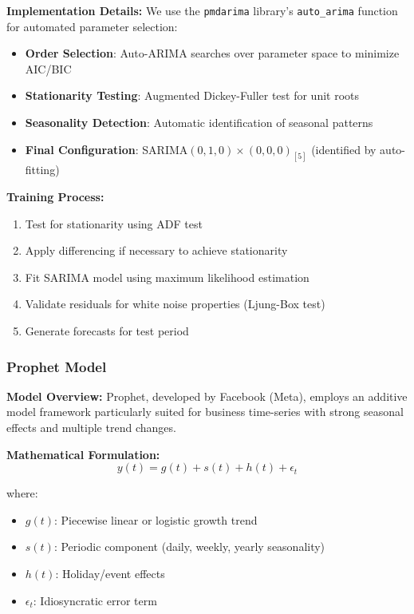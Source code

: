 \textbf{Implementation Details:}
We use the \texttt{pmdarima} library's \texttt{auto\_arima} function for automated parameter selection:

\begin{itemize}
    \item \textbf{Order Selection}: Auto-ARIMA searches over parameter space to minimize AIC/BIC
    \item \textbf{Stationarity Testing}: Augmented Dickey-Fuller test for unit roots
    \item \textbf{Seasonality Detection}: Automatic identification of seasonal patterns
    \item \textbf{Final Configuration}: SARIMA$(0,1,0) \times (0,0,0)_{[5]}$ (identified by auto-fitting)
\end{itemize}

\textbf{Training Process:}
\begin{enumerate}
    \item Test for stationarity using ADF test
    \item Apply differencing if necessary to achieve stationarity
    \item Fit SARIMA model using maximum likelihood estimation
    \item Validate residuals for white noise properties (Ljung-Box test)
    \item Generate forecasts for test period
\end{enumerate}

\subsubsection{Prophet Model}

\textbf{Model Overview:}
Prophet, developed by Facebook (Meta), employs an additive model framework particularly suited for business time-series with strong seasonal effects and multiple trend changes.

\textbf{Mathematical Formulation:}
\begin{equation}
y(t) = g(t) + s(t) + h(t) + \epsilon_t
\end{equation}

where:
\begin{itemize}
    \item $g(t)$: Piecewise linear or logistic growth trend
    \item $s(t)$: Periodic component (daily, weekly, yearly seasonality)
    \item $h(t)$: Holiday/event effects
    \item $\epsilon_t$: Idiosyncratic error term
\end{itemize}

